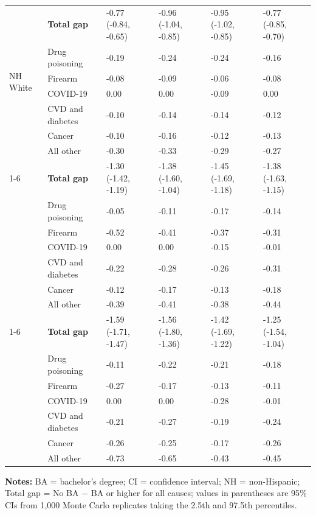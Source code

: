 \begin{threeparttable}
\begin{tabular}{llllll}
\multirow{7}{*}{NH White} & \textbf{Total gap} & -0.77 (-0.84, -0.65) & -0.96 (-1.04, -0.85) & -0.95 (-1.02, -0.85) & -0.77 (-0.85, -0.70) \\
 & Drug poisoning & -0.19 & -0.24 & -0.24 & -0.16 \\
 & Firearm & -0.08 & -0.09 & -0.06 & -0.08 \\
 & COVID-19 & 0.00 & 0.00 & -0.09 & 0.00 \\
 & CVD and diabetes & -0.10 & -0.14 & -0.14 & -0.12 \\
 & Cancer & -0.10 & -0.16 & -0.12 & -0.13 \\
 & All other & -0.30 & -0.33 & -0.29 & -0.27 \\
\cmidrule(lr){1-6}
\multirow{7}{*}{NH Black} & \textbf{Total gap} & -1.30 (-1.42, -1.19) & -1.38 (-1.60, -1.04) & -1.45 (-1.69, -1.18) & -1.38 (-1.63, -1.15) \\
 & Drug poisoning & -0.05 & -0.11 & -0.17 & -0.14 \\
 & Firearm & -0.52 & -0.41 & -0.37 & -0.31 \\
 & COVID-19 & 0.00 & 0.00 & -0.15 & -0.01 \\
 & CVD and diabetes & -0.22 & -0.28 & -0.26 & -0.31 \\
 & Cancer & -0.12 & -0.17 & -0.13 & -0.18 \\
 & All other & -0.39 & -0.41 & -0.38 & -0.44 \\
\cmidrule(lr){1-6}
\multirow{7}{*}{Hispanic} & \textbf{Total gap} & -1.59 (-1.71, -1.47) & -1.56 (-1.80, -1.36) & -1.42 (-1.69, -1.22) & -1.25 (-1.54, -1.04) \\
 & Drug poisoning & -0.11 & -0.22 & -0.21 & -0.18 \\
 & Firearm & -0.27 & -0.17 & -0.13 & -0.11 \\
 & COVID-19 & 0.00 & 0.00 & -0.28 & -0.01 \\
 & CVD and diabetes & -0.21 & -0.27 & -0.19 & -0.24 \\
 & Cancer & -0.26 & -0.25 & -0.17 & -0.26 \\
 & All other & -0.73 & -0.65 & -0.43 & -0.45 \\
\bottomrule
\end{tabular}
\begin{tablenotes}[flushleft]
\small
\item \textbf{Notes:} BA = bachelor's degree; CI = confidence interval; NH = non-Hispanic; Total gap = No BA $-$ BA or higher for all causes; values in parentheses are 95\% CIs from 1,000 Monte Carlo replicates taking the 2.5th and 97.5th percentiles.
\end{tablenotes}
\end{threeparttable}

